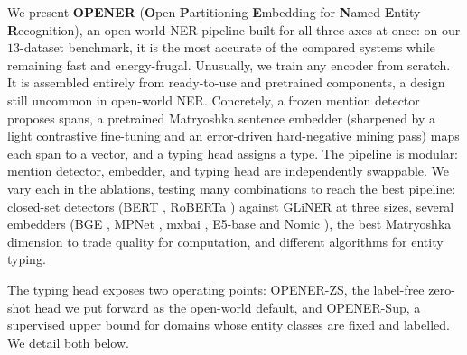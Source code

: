 \bigskip We present \textbf{OPENER} (\textbf{O}pen \textbf{P}artitioning \textbf{E}mbedding for \textbf{N}amed \textbf{E}ntity \textbf{R}ecognition), an open-world NER pipeline built for all three axes at once: on our $13$-dataset benchmark, it is the most accurate of the compared systems while remaining fast and energy-frugal. Unusually, we train any encoder from scratch. It is assembled entirely from ready-to-use and pretrained components, a design still uncommon in open-world NER.
Concretely, a frozen mention detector proposes spans, a pretrained Matryoshka sentence embedder (sharpened by a light contrastive fine-tuning and an error-driven hard-negative mining pass) maps each span to a vector, and a typing head assigns a type.
The pipeline is modular: mention detector, embedder, and typing head are independently swappable. We vary each in the ablations, testing many combinations to reach the best pipeline: closed-set detectors (BERT \cite{devlin2019bert}, RoBERTa \cite{liu2019roberta}) against GLiNER \cite{zaratiana2024gliner} at three sizes, several embedders (BGE \cite{xiao2024cpack}, MPNet \cite{song2020mpnet}, mxbai \cite{li2024aoe}, E5-base \cite{wang2022e5} and Nomic \cite{nussbaum2024nomic}), the best Matryoshka \cite{kusupati2022matryoshka} dimension to trade quality for computation, and different algorithms for entity typing.

The typing head exposes two operating points: OPENER-ZS, the label-free zero-shot head we put forward as the open-world default, and OPENER-Sup, a supervised upper bound for domains whose entity classes are fixed and labelled. We detail both below.

